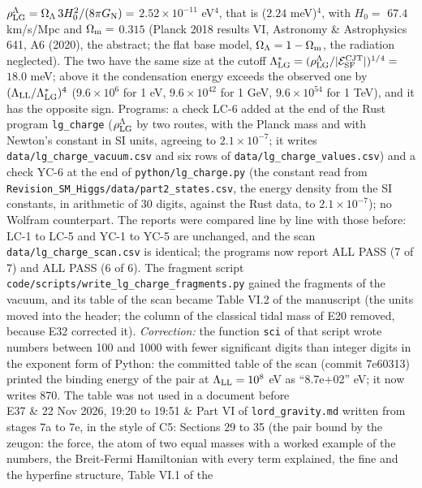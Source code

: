 \documentclass[
  10pt,
]{article}
\begin{document}
\begin{longtable}[]
\(\rho^\Lambda_{\rm LG}=\Omega_\Lambda\,3H_0^2/(8\pi G_{\rm N})=\)
\(2.52\times10^{-11}\) eV\(^4\), that is (\(2.24\) meV)\(^4\), with
\(H_0=\) \(67.4\) km/s/Mpc and \(\Omega_{\rm m}=\) \(0.315\) (Planck
2018 results VI, Astronomy \& Astrophysics 641, A6 (2020), the abstract;
the flat base model, \(\Omega_\Lambda=1-\Omega_{\rm m}\), the radiation
neglected). The two have the same size at the cutoff
\(\Lambda^*_{\rm LG}=(\rho^\Lambda_{\rm LG}/\lvert\mathcal E^{\rm CJT}_{\rm SF}\rvert)^{1/4}=\)
\(18.0\) meV; above it the condensation energy exceeds the observed one
by \((\Lambda_{\rm LL}/\Lambda^*_{\rm LG})^4\) (\(9.6\times10^{6}\) for
1 eV, \(9.6\times10^{42}\) for 1 GeV, \(9.6\times10^{54}\) for 1 TeV),
and it has the opposite sign. Programs: a check LC-6 added at the end of
the Rust program \texttt{lg\_charge} (\(\rho^\Lambda_{\rm LG}\) by two
routes, with the Planck mass and with Newton's constant in SI units,
agreeing to \(2.1\times10^{-7}\); it writes
\texttt{data/lg\_charge\_vacuum.csv} and six rows of
\texttt{data/lg\_charge\_values.csv}) and a check YC-6 at the end of
\texttt{python/lg\_charge.py} (the constant read from
\texttt{Revision\_SM\_Higgs/data/part2\_states.csv}, the energy density
from the SI constants, in arithmetic of 30 digits, against the Rust
data, to \(2.1\times10^{-7}\)); no Wolfram counterpart. The reports were
compared line by line with those before: LC-1 to LC-5 and YC-1 to YC-5
are unchanged, and the scan \texttt{data/lg\_charge\_scan.csv} is
identical; the programs now report ALL PASS (7 of 7) and ALL PASS (6 of
6). The fragment script
\texttt{code/scripts/write\_lg\_charge\_fragments.py} gained the
fragments of the vacuum, and its table of the scan became Table VI.2 of
the manuscript (the units moved into the header; the column of the
classical tidal mass of E20 removed, because E32 corrected it).
\emph{Correction:} the function \texttt{sci} of that script wrote
numbers between 100 and 1000 with fewer significant digits than integer
digits in the exponent form of Python: the committed table of the scan
(commit 7e60313) printed the binding energy of the pair at
\(\Lambda_{\rm LL}=10^8\) eV as ``8.7e+02'' eV; it now writes 870. The
table was not used in a document before \\
E37 & 22 Nov 2026, 19:20 to 19:51 & Part VI of \texttt{lord\_gravity.md}
written from stages 7a to 7e, in the style of C5: Sections 29 to 35 (the
pair bound by the zeugon: the force, the atom of two equal masses with a
worked example of the numbers, the Breit-Fermi Hamiltonian with every
term explained, the fine and the hyperfine structure, Table VI.1 of the

\end{longtable}
\end{document}
